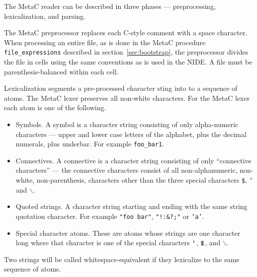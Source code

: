\documentclass{article}
\newcommand{\mtt}[1]{\mbox{\tt #1}}
\begin{document}
The MetaC reader can be described in three phases --- preprocessing, lexicalization, and parsing.

The MetaC preprocessor replaces each C-style comment with a space character.  When processing an entire file,
as is done in the MetaC procedure {\tt file\_expressions}
described in section~\ref{sec:bootstrap}, the preprocessor divides the file in cells using the same conventions as is used in the NIDE.
A file must be parenthesis-balanced within each cell.

Lexicalization segments a pre-processed character sting into to a sequence of atoms.
The MetaC lexer preserves all non-white characters.  For the MetaC lexer each atom is one of the following.

\begin{itemize}
\item Symbols.  A symbol is a character string consisting of only alpha-numeric characters --- upper and lower case letters of the alphabet, plus the decimal numerals, plus underbar.
  For example {\tt foo\_bar1}.
\item Connectives.  A connective is a character string consisting of only ``connective characters'' --- the connective characters consist of all non-alphanumeric, non-white, non-parenthesis, characters
  other than the three special characters {\tt \$}, {\tt `} and $\backslash$.
\item Quoted strings.  A character string starting and ending with the same string quotation character.  For example {\tt "foo bar"}, {\tt "!:\&?;"} or {\tt 'a'}.
\item Special character atoms. These are atoms whose strings are one character long where that character is one of
  the special characters $\mtt{`}$, $\mtt{\$}$, and $\backslash$.
\end{itemize}

Two strings will be called whitespace-equivalent if they lexicalize to the same sequence of atoms.

\newcommand{\sym}{\mathrm{SYM}}
\newcommand{\conn}{\mathrm{CONN}}
\newcommand{\quot}{\mathrm{QUOTE}}
\newcommand{\misc}{\mathrm{MISC}}
\newcommand{\app}{\mathrm{APP}}
\newcommand{\var}{\mathrm{VAR}}
\end{document}

